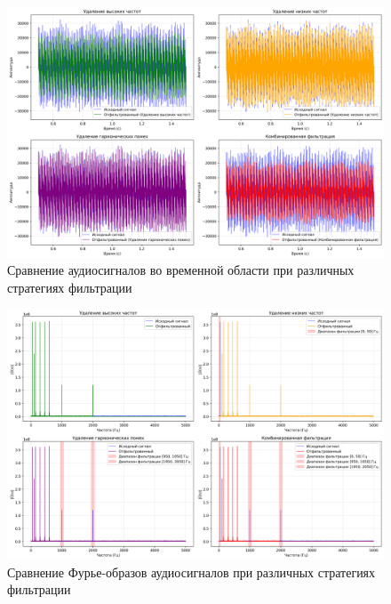 \begin{figure}[H]
\centering
\includegraphics[width=\textwidth]{images/task2/audio_filter_time_domain.png}
\caption{Сравнение аудиосигналов во временной области при различных стратегиях фильтрации}
\end{figure}

\begin{figure}[H]
\centering
\includegraphics[width=\textwidth]{images/task2/audio_filter_freq_domain.png}
\caption{Сравнение Фурье-образов аудиосигналов при различных стратегиях фильтрации}
\end{figure}

